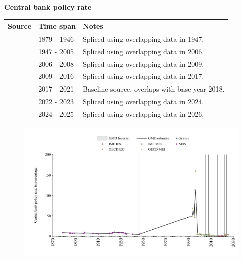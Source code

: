 \documentclass[12pt,a4paper,landscape]{article}
\begin{document}
\begin{adjustbox}{max totalsize={\paperwidth}{\paperheight},center}
\begin{minipage}[t][\textheight][t]{\textwidth}
\vspace*{0.5cm}
{}
\begin{center}
{\Large\bfseries Central bank policy rate}
\end{center}
\vspace{0.5cm}
\begin{table}[H]
\centering
\small
\begin{tabular}{|l|l|l|}
\hline
\textbf{Source} & \textbf{Time span} & \textbf{Notes} \\
\hline
\rowcolor{white}\cite{NBS}& 1879 - 1946 &Spliced using overlapping data in 1947. \\
\rowcolor{lightgray}\cite{OECD_MEI}& 1947 - 2005 &Spliced using overlapping data in 2006. \\
\rowcolor{white}\cite{IMF_MFS}& 2006 - 2008 &Spliced using overlapping data in 2009. \\
\rowcolor{lightgray}\cite{OECD_MEI}& 2009 - 2016 &Spliced using overlapping data in 2017. \\
\rowcolor{white}\cite{Grimm}& 2017 - 2021 &Baseline source, overlaps with base year 2018. \\
\rowcolor{lightgray}\cite{OECD_MEI}& 2022 - 2023 &Spliced using overlapping data in 2024. \\
\rowcolor{white}\cite{OECD_EO}& 2024 - 2025 &Spliced using overlapping data in 2026. \\
\hline
\end{tabular}
\end{table}
\begin{figure}[H]
\centering
\includegraphics[width=\textwidth,height=0.6\textheight,keepaspectratio]{graphs/BGR_cbrate.pdf}
\end{figure}
\end{minipage}
\end{adjustbox}
\end{document}
